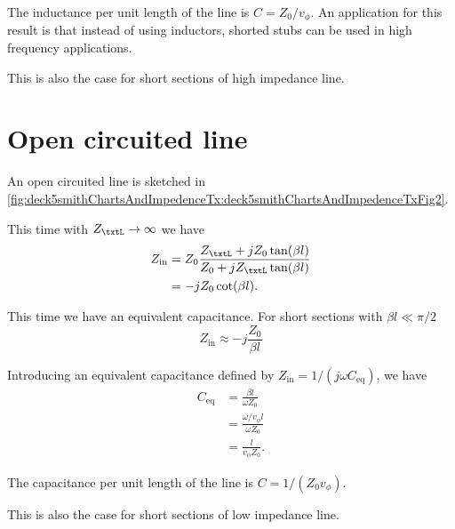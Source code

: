 The inductance per unit length of the line is \( C = Z_0/v_\phi \).  An application for this result is that instead of using inductors, shorted stubs can be used in high frequency applications.

This is also the case for short sections of high impedance line.

\section{Open circuited line}
An open circuited line is sketched in \cref{fig:deck5smithChartsAndImpedenceTx:deck5smithChartsAndImpedenceTxFig2}.


This time with \( Z_\txtL \rightarrow \infty \) we have
\begin{equation}\label{eqn:uwavesDeck5SmithChartCore:120}
\begin{aligned}
Z_{\textrm{in}}
&= Z_0 \frac{ Z_\txtL + j Z_0 \tan(\beta l) }{ Z_0 + j Z_\txtL \tan(\beta l)}
\\ &= -j Z_0 \cot(\beta l).
\end{aligned}
\end{equation}

This time we have an equivalent capacitance.  For short sections with \( \beta l \ll \pi/2 \)
\begin{equation}\label{eqn:uwavesDeck5SmithChartCore:140}
Z_{\textrm{in}}
\approx
-j \frac{Z_0}{\beta l}
\end{equation}

Introducing an equivalent capacitance defined by \( Z_{\textrm{in}} = 1/(j \omega C_{\mathrm{eq}}) \), we have
\begin{equation}\label{eqn:uwavesDeck5SmithChartCore:160}
\begin{aligned}
C_{\mathrm{eq}}
&=
\frac{ \beta l}{\omega Z_0}
\\ &=
\frac{ \omega/v_\phi l}{\omega Z_0}
\\ &=
\frac{ l}{v_\phi Z_0}.
\end{aligned}
\end{equation}

The capacitance per unit length of the line is \( C = 1/(Z_0 v_\phi) \).

This is also the case for short sections of low impedance line.

